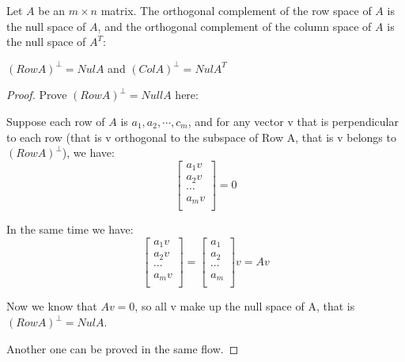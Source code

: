 \begin{theorem}
    Let \(A\) be an \(m \times n\) matrix.   
    The orthogonal complement of the row space of \(A\) is the null space of \(A\),
    and the orthogonal complement of the column space of \(A\) is the null space of \(A^T\):
        
    \((Row A)^{\perp} = Nul A\) and \((Col A)^{\perp} = Nul A^T\)  
\end{theorem}
\begin{proof}
    Prove \((Row A)^{\perp} = Null A\)  here:

    Suppose each row of \(A\) is \(a_1, a_2, \cdots, c_m\), and for any vector v that is perpendicular to each row (that is v orthogonal to the subspace of Row A, that is v belongs to \((Row A)^{\perp}\)), we have:
    \[
        \begin{bmatrix}
             a_1v \\
             a_2v \\
             \cdots \\
             a_mv \\
        \end{bmatrix} = 0
    \] 

    In the same time we have:
    \[
         \begin{bmatrix}
             a_1v \\
             a_2v \\
             \cdots \\
             a_mv \\
        \end{bmatrix}
        = 
        \begin{bmatrix}
             a_1 \\
             a_2 \\
             \cdots \\
             a_m \\
        \end{bmatrix}v
        = Av
    \]

    Now we know that \(Av = 0\), so all v make up the null space of A, that is \((Row A)^{\perp} = Nul A\). 
    
    Another one can be proved in the same flow.
\end{proof}